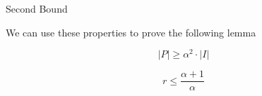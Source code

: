\begin{frame}{Second Bound}

We can use these properties to prove the following lemma 

\begin{lemma}
$$ |P| \geq \alpha^2 \cdot |I| $$
\end{lemma}

\pause\begin{corollary}
$$ r \leq \frac{\alpha + 1}{\alpha} $$
\end{corollary}


\end{frame}

